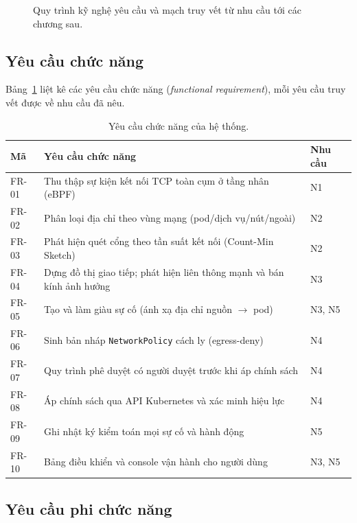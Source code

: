 \begin{figure}[H]
  \centering
  \resizebox{0.96\linewidth}{!}{}
  \caption{Quy trình kỹ nghệ yêu cầu và mạch truy vết từ nhu cầu tới các chương sau.}
  \label{fig:re-process}
\end{figure}

\subsection{Yêu cầu chức năng}

Bảng~\ref{tab:fr} liệt kê các yêu cầu chức năng (\textit{functional requirement}), mỗi
yêu cầu truy vết được về nhu cầu đã nêu.

\begin{table}[H]
  \centering
  \caption{Yêu cầu chức năng của hệ thống.}
  \label{tab:fr}
  \small
  \begin{tabularx}{\linewidth}{@{}l X l@{}}
    \toprule
    \textbf{Mã} & \textbf{Yêu cầu chức năng} & \textbf{Nhu cầu} \\
    \midrule
    FR-01 & Thu thập sự kiện kết nối TCP toàn cụm ở tầng nhân (eBPF)        & N1 \\
    FR-02 & Phân loại địa chỉ theo vùng mạng (pod/dịch vụ/nút/ngoài)        & N2 \\
    FR-03 & Phát hiện quét cổng theo tần suất kết nối (Count-Min Sketch)    & N2 \\
    FR-04 & Dựng đồ thị giao tiếp; phát hiện liên thông mạnh và bán kính ảnh hưởng & N3 \\
    FR-05 & Tạo và làm giàu sự cố (ánh xạ địa chỉ nguồn $\rightarrow$ pod)  & N3, N5 \\
    FR-06 & Sinh bản nháp \texttt{NetworkPolicy} cách ly (egress-deny)      & N4 \\
    FR-07 & Quy trình phê duyệt có người duyệt trước khi áp chính sách      & N4 \\
    FR-08 & Áp chính sách qua API Kubernetes và xác minh hiệu lực           & N4 \\
    FR-09 & Ghi nhật ký kiểm toán mọi sự cố và hành động                    & N5 \\
    FR-10 & Bảng điều khiển và console vận hành cho người dùng              & N3, N5 \\
    \bottomrule
  \end{tabularx}
\end{table}

\subsection{Yêu cầu phi chức năng}

